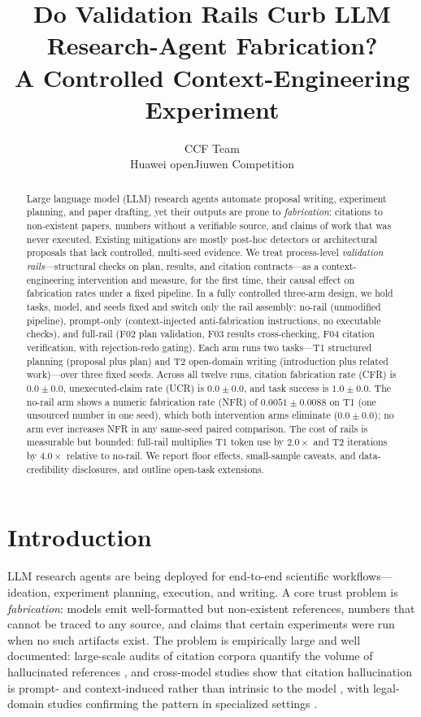 \documentclass[10pt,twocolumn]{article}
\title{Do Validation Rails Curb LLM Research-Agent Fabrication?\\ A Controlled Context-Engineering Experiment}
\author{CCF Team\\ Huawei openJiuwen Competition}
\date{}
\begin{document}
\maketitle

\begin{abstract}
Large language model (LLM) research agents automate proposal writing, experiment planning, and paper drafting, yet their outputs are prone to \emph{fabrication}: citations to non-existent papers, numbers without a verifiable source, and claims of work that was never executed. Existing mitigations are mostly post-hoc detectors or architectural proposals that lack controlled, multi-seed evidence. We treat process-level \emph{validation rails}---structural checks on plan, results, and citation contracts---as a context-engineering intervention and measure, for the first time, their causal effect on fabrication rates under a fixed pipeline. In a fully controlled three-arm design, we hold tasks, model, and seeds fixed and switch only the rail assembly: no-rail (unmodified pipeline), prompt-only (context-injected anti-fabrication instructions, no executable checks), and full-rail (F02 plan validation, F03 results cross-checking, F04 citation verification, with rejection-redo gating). Each arm runs two tasks---T1 structured planning (proposal plus plan) and T2 open-domain writing (introduction plus related work)---over three fixed seeds. Across all twelve runs, citation fabrication rate (CFR) is $0.0 \pm 0.0$, unexecuted-claim rate (UCR) is $0.0 \pm 0.0$, and task success is $1.0 \pm 0.0$. The no-rail arm shows a numeric fabrication rate (NFR) of $0.0051 \pm 0.0088$ on T1 (one unsourced number in one seed), which both intervention arms eliminate ($0.0 \pm 0.0$); no arm ever increases NFR in any same-seed paired comparison. The cost of rails is measurable but bounded: full-rail multiplies T1 token use by $2.0\times$ and T2 iterations by $4.0\times$ relative to no-rail. We report floor effects, small-sample caveats, and data-credibility disclosures, and outline open-task extensions.
\end{abstract}

\section{Introduction}
\label{sec:intro}

LLM research agents are being deployed for end-to-end scientific workflows---ideation, experiment planning, execution, and writing. A core trust problem is \emph{fabrication}: models emit well-formatted but non-existent references, numbers that cannot be traced to any source, and claims that certain experiments were run when no such artifacts exist. The problem is empirically large and well documented: large-scale audits of citation corpora quantify the volume of hallucinated references \citep{zhao2026wildhallucinations}, and cross-model studies show that citation hallucination is prompt- and context-induced rather than intrinsic to the model \citep{naser2026howllmscite}, with legal-domain studies confirming the pattern in specialized settings \citep{alrajeh2026legalcitations}.
\end{document}
